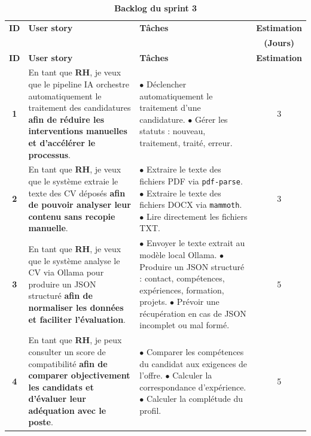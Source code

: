 \documentclass[12pt,a4paper,oneside]{report}
\begin{document}
\begin{itemize}
\small
\renewcommand{\arraystretch}{1.5}
\begin{xltabular}{\textwidth}{|c|>{\RaggedRight}p{4cm}|X|c|}
\caption{ \textbf{Backlog du sprint 3}} \\
\hline
\textbf{ID} & \textbf{User story} & \textbf{Tâches} & \textbf{Estimation} \\
 & & & \textbf{(Jours)} \\ \hline
\endfirsthead

\hline
\textbf{ID} & \textbf{User story} & \textbf{Tâches} & \textbf{Estimation} \\ \hline
\endhead

\hline
\endfoot

\hline
\endlastfoot

\textbf{1} & En tant que \textbf{RH}, je veux que le pipeline IA orchestre automatiquement le traitement des candidatures \textbf{afin de réduire les interventions manuelles et d’accélérer le processus}.
& $\bullet$ Déclencher automatiquement le traitement d'une candidature. \newline
$\bullet$ Gérer les statuts : nouveau, traitement, traité, erreur. & 3 \\ \hline

\textbf{2} & En tant que \textbf{RH}, je veux que le système extraie le texte des CV déposés \textbf{afin de pouvoir analyser leur contenu sans recopie manuelle}.
& $\bullet$ Extraire le texte des fichiers PDF via \texttt{pdf-parse}. \newline
$\bullet$ Extraire le texte des fichiers DOCX via \texttt{mammoth}. \newline
$\bullet$ Lire directement les fichiers TXT. & 3 \\ \hline

\textbf{3} & En tant que \textbf{RH}, je veux que le système analyse le CV via Ollama pour produire un JSON structuré \textbf{afin de normaliser les données et faciliter l’évaluation}.
& $\bullet$ Envoyer le texte extrait au modèle local Ollama. \newline
$\bullet$ Produire un JSON structuré : contact, compétences, expériences, formation, projets. \newline
$\bullet$ Prévoir une récupération en cas de JSON incomplet ou mal formé. & 5 \\ \hline

\textbf{4} & En tant que \textbf{RH}, je peux consulter un score de compatibilité \textbf{afin de comparer objectivement les candidats et d’évaluer leur adéquation avec le poste}.
& $\bullet$ Comparer les compétences du candidat aux exigences de l'offre. \newline
$\bullet$ Calculer la correspondance d'expérience. \newline
$\bullet$ Calculer la complétude du profil. & 5 \\ \hline


\end{xltabular}
\end{itemize}
\end{document}
